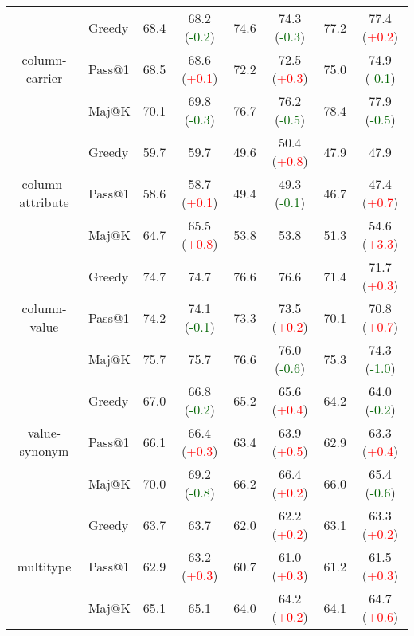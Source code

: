 \begin{table*}[t!]
\begin{adjustbox}{max width=\textwidth}
\begin{tabular}{c | l | c c | c c | c c }
        \multirow{3}{*}{column-carrier} & Greedy & 68.4 & 68.2 (\textcolor{darkgreen}{-0.2}) & 74.6 & 74.3 (\textcolor{darkgreen}{-0.3}) & 77.2 & 77.4 (\textcolor{red}{+0.2}) \\
& Pass@1 & 68.5 & 68.6 (\textcolor{red}{+0.1}) & 72.2 & 72.5 (\textcolor{red}{+0.3}) & 75.0 & 74.9 (\textcolor{darkgreen}{-0.1}) \\
& Maj@K & 70.1 & 69.8 (\textcolor{darkgreen}{-0.3}) & 76.7 & 76.2 (\textcolor{darkgreen}{-0.5}) & 78.4 & 77.9 (\textcolor{darkgreen}{-0.5}) \\
 \midrule

        \multirow{3}{*}{column-attribute} & Greedy & 59.7 & 59.7 \phantom{(+0.3)} & 49.6 & 50.4 (\textcolor{red}{+0.8}) & 47.9 & 47.9 \phantom{(+0.3)} \\
& Pass@1 & 58.6 & 58.7 (\textcolor{red}{+0.1}) & 49.4 & 49.3 (\textcolor{darkgreen}{-0.1}) & 46.7 & 47.4 (\textcolor{red}{+0.7}) \\
& Maj@K & 64.7 & 65.5 (\textcolor{red}{+0.8}) & 53.8 & 53.8 \phantom{(+0.3)} & 51.3 & 54.6 (\textcolor{red}{+3.3}) \\
 \midrule 

        \multirow{3}{*}{column-value} & Greedy & 74.7 & 74.7 \phantom{(+0.3)} & 76.6 & 76.6 \phantom{(+0.3)} & 71.4 & 71.7 (\textcolor{red}{+0.3}) \\
& Pass@1 & 74.2 & 74.1 (\textcolor{darkgreen}{-0.1}) & 73.3 & 73.5 (\textcolor{red}{+0.2}) & 70.1 & 70.8 (\textcolor{red}{+0.7}) \\
& Maj@K & 75.7 & 75.7 \phantom{(+0.3)} & 76.6 & 76.0 (\textcolor{darkgreen}{-0.6}) & 75.3 & 74.3 (\textcolor{darkgreen}{-1.0}) \\
 \midrule

        \multirow{3}{*}{value-synonym} & Greedy & 67.0 & 66.8 (\textcolor{darkgreen}{-0.2}) & 65.2 & 65.6 (\textcolor{red}{+0.4}) & 64.2 & 64.0 (\textcolor{darkgreen}{-0.2}) \\
& Pass@1 & 66.1 & 66.4 (\textcolor{red}{+0.3}) & 63.4 & 63.9 (\textcolor{red}{+0.5}) & 62.9 & 63.3 (\textcolor{red}{+0.4}) \\
& Maj@K & 70.0 & 69.2 (\textcolor{darkgreen}{-0.8}) & 66.2 & 66.4 (\textcolor{red}{+0.2}) & 66.0 & 65.4 (\textcolor{darkgreen}{-0.6}) \\
 \midrule

        \multirow{3}{*}{multitype} & Greedy & 63.7 & 63.7 \phantom{(+0.3)} & 62.0 & 62.2 (\textcolor{red}{+0.2}) & 63.1 & 63.3 (\textcolor{red}{+0.2}) \\
& Pass@1 & 62.9 & 63.2 (\textcolor{red}{+0.3}) & 60.7 & 61.0 (\textcolor{red}{+0.3}) & 61.2 & 61.5 (\textcolor{red}{+0.3}) \\
& Maj@K & 65.1 & 65.1 \phantom{(+0.3)} & 64.0 & 64.2 (\textcolor{red}{+0.2}) & 64.1 & 64.7 (\textcolor{red}{+0.6}) \\
 \midrule
        

\end{tabular}
\end{adjustbox}
\end{table*}

